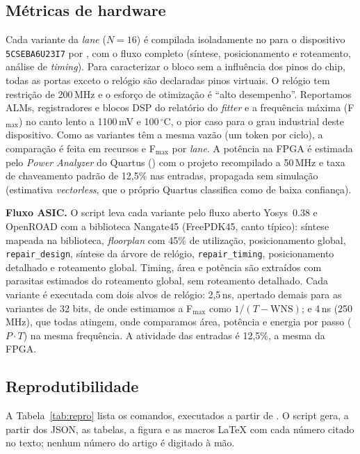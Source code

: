 \documentclass[12pt]{article}
\begin{document}
\subsection{Métricas de hardware}
Cada variante da \emph{lane} ($N=16$) é compilada isoladamente no \QuartusVersion{} para o dispositivo \texttt{5CSEBA6U23I7} por , com o fluxo completo (síntese, posicionamento e roteamento, análise de \emph{timing}). Para caracterizar o bloco sem a influência dos pinos do chip, todas as portas exceto o relógio são declaradas pinos virtuais. O relógio tem restrição de 200\,MHz e o esforço de otimização é ``alto desempenho''. Reportamos ALMs, registradores e blocos DSP do relatório do \emph{fitter} e a frequência máxima (F$_{\max}$) no canto lento a 1100\,mV e 100\,$^\circ$C, o pior caso para o grau industrial deste dispositivo. Como as variantes têm a mesma vazão (um token por ciclo), a comparação é feita em recursos e F$_{\max}$ por \emph{lane}. A potência na FPGA é estimada pelo \emph{Power Analyzer} do Quartus () com o projeto recompilado a 50\,MHz e taxa de chaveamento padrão de 12,5\% nas entradas, propagada sem simulação (estimativa \emph{vectorless}, que o próprio Quartus classifica como de baixa confiança).

\textbf{Fluxo ASIC.} O script  leva cada variante pelo fluxo aberto Yosys~0.38 e OpenROAD com a biblioteca Nangate45 (FreePDK45, canto típico): síntese mapeada na biblioteca, \emph{floorplan} com 45\% de utilização, posicionamento global, \texttt{repair\_design}, síntese da árvore de relógio, \texttt{repair\_timing}, posicionamento detalhado e roteamento global. Timing, área e potência são extraídos com parasitas estimados do roteamento global, sem roteamento detalhado. Cada variante é executada com dois alvos de relógio: 2,5\,ns, apertado demais para as variantes de 32 bits, de onde estimamos a F$_{\max}$ como $1/(T - \mathrm{WNS})$; e 4\,ns (250\,MHz), que todas atingem, onde comparamos área, potência e energia por passo ($P \cdot T$) na mesma frequência. A atividade das entradas é 12,5\%, a mesma da FPGA.

\subsection{Reprodutibilidade}
A Tabela~\ref{tab:repro} lista os comandos, executados a partir de . O script  gera, a partir dos JSON, as tabelas, a figura e as macros \LaTeX{} com cada número citado no texto; nenhum número do artigo é digitado à mão.
\end{document}
